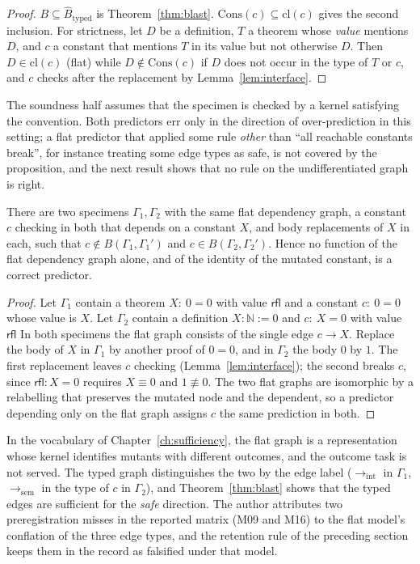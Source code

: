 \begin{proof}
$B\subseteq\widehat B_{\mathrm{typed}}$ is Theorem~\ref{thm:blast}. $\mathrm{Cons}(c)\subseteq\mathrm{cl}(c)$ gives the second inclusion. For strictness, let $D$ be a definition, $T$ a theorem whose \emph{value} mentions $D$, and $c$ a constant that mentions $T$ in its value but not otherwise $D$. Then $D\in\mathrm{cl}(c)$ (flat) while $D\notin\mathrm{Cons}(c)$ if $D$ does not occur in the type of $T$ or $c$, and $c$ checks after the replacement by Lemma~\ref{lem:interface}.
\end{proof}

The soundness half assumes that the specimen is checked by a kernel satisfying the convention. Both predictors err only in the direction of over-prediction in this setting; a flat predictor that applied some rule \emph{other} than ``all reachable constants break'', for instance treating some edge types as safe, is not covered by the proposition, and the next result shows that no rule on the undifferentiated graph is right.

\begin{proposition}
\label{prop:flat-insufficient}
There are two specimens $\Gamma_1,\Gamma_2$ with the same flat dependency graph, a constant $c$ checking in both that depends on a constant $X$, and body replacements of $X$ in each, such that $c\notin B(\Gamma_1,\Gamma_1')$ and $c\in B(\Gamma_2,\Gamma_2')$. Hence no function of the flat dependency graph alone, and of the identity of the mutated constant, is a correct predictor.
\end{proposition}

\begin{proof}
Let $\Gamma_1$ contain a theorem $X:\ 0=0$ with value $\mathsf{rfl}$ and a constant $c:\ 0=0$ whose value is $X$. Let $\Gamma_2$ contain a definition $X:\mathbb N:=0$ and $c:\ X=0$ with value $\mathsf{rfl}$ In both specimens the flat graph consists of the single edge $c\to X$. Replace the body of $X$ in $\Gamma_1$ by another proof of $0=0$, and in $\Gamma_2$ the body $0$ by $1$. The first replacement leaves $c$ checking (Lemma~\ref{lem:interface}); the second breaks $c$, since $\mathsf{rfl}:X=0$ requires $X\equiv0$ and $1\not\equiv0$. The two flat graphs are isomorphic by a relabelling that preserves the mutated node and the dependent, so a predictor depending only on the flat graph assigns $c$ the same prediction in both.
\end{proof}

In the vocabulary of Chapter~\ref{ch:sufficiency}, the flat graph is a representation whose kernel identifies mutants with different outcomes, and the outcome task is not served. The typed graph distinguishes the two by the edge label ($\to_{\mathrm{int}}$ in $\Gamma_1$, $\to_{\mathrm{sem}}$ in the type of $c$ in $\Gamma_2$), and Theorem~\ref{thm:blast} shows that the typed edges are sufficient for the \emph{safe} direction. The author attributes two preregistration misses in the reported matrix (M09 and M16) to the flat model's conflation of the three edge types, and the retention rule of the preceding section keeps them in the record as falsified under that model.

